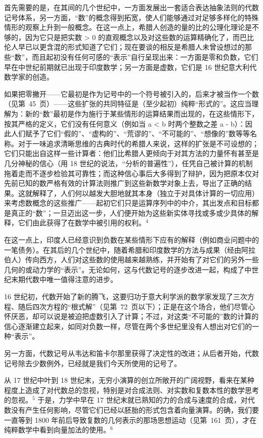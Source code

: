 首先需要的是，在其间的几个世纪中，一方面发展出一套适合表达抽象法则的代数记号体系，另一方面，“数”的概念得到拓宽，使人们能够通过对足够多样化的特殊情形的观察上升到一般概念。在这一点上，希腊人创造的量的比的公理化理论是不够的，因为它只是把实数 \textgreater{} 0 的直观概念以及对这些数的运算精确化了，而巴比伦人早已以更含混的形式知道了它们；现在要谈的相反是希腊人未曾设想过的那些“数”，而且起初没有任何可感的“表示”自行呈现出来：一方面是零和负数，它们早在中世纪前期就已出现于印度数学；另一方面是虚数，它们是 16 世纪意大利代数学家的创造。

如果把零撇开——它最初是作为记号中的一个符号被引入的，后来才被当作一个数（见第~45~页）——这些扩张的共同特征是（至少起初）纯粹“形式的”。这应当理解为：新的“数”最初是作为施行于某些情形的运算结果而出现的，在这些情形下，按其严格的定义，它们没有任何意义（例如当 a \textless{} b 时两个整数之差 a - b）：因此人们赋予了它们“假的”、“虚构的”、“荒谬的”、“不可能的”、“想像的”数等等名称。对于一味追求清晰思维的古典时代的希腊人来说，这样的扩张是不可设想的；它们只能出自这样一些计算者：他们比希腊人更倾向于对其方法的力量怀有甚至是几分神秘的信心（用 18 世纪的说法，“分析的普遍性”），任凭自己被计算的机制拖着走而不逐步检验其可靠性；而这种信心事后大多得到了辩护，因为把原本仅对先前已知的数严格有效的计算法则推广到这些新数学对象上去，导出了正确的结果。这就解释了，人们何以越发大胆地就其本身（独立于对具体计算的一切应用）来考虑数概念的这些推广——起初它们只是运算序列中的中介，其出发点和目标都是真正的“数”；一旦迈出这一步，人们便开始为这些新实体寻找或多或少具体的解释，它们由此获得了在数学中被引用的权利。\(^{4}\)

在这一点上，印度人已经意识到负数在某些情形下应有的解释（例如商业问题中的一笔债务）。在其后的几个世纪中，随着希腊和印度数学的方法与成果（经由阿拉伯人）传向西方，人们对这些数的使用越来越熟练，并开始有了对它们的另外一些几何的或动力学的“表示”。无论如何，这与代数记号的逐步改进一起，构成了中世纪末期代数中唯一值得注意的进步。

16 世纪初，代数开始了新的腾飞，这要归功于意大利学派的数学家发现了三次方程、随后四次方程的“根式解”（见第~72~页以下）；正是在这个场合，他们尽管心怀厌恶，却可以说是被迫把虚数引入了计算；不过，对这类“不可能的”数的计算的信心逐渐建立起来，如同对负数一样，尽管在两个多世纪里没有人想出对它们的一种“表示”。

另一方面，代数记号从韦达和笛卡尔那里获得了决定性的改进；从后者开始，代数记号除去少数例外，已经就是我们今天所使用的记号了。

从 17 世纪中叶到 18 世纪末，无穷小演算的创立所敞开的广阔视野，看来在某种程度上造成了对代数总的忽视，特别是对合成法则、对实数和复数本性的数学思考的忽视。\(^{5}\) 于是，力学中早在 17 世纪末就已熟知的力的合成与速度的合成，对代数没有产生任何影响，尽管它们已经以胚胎的形式包含着向量演算。的确，我们要一直等到 1800 年前后导致复数的几何表示的那场思想运动（见第~161~页），才在纯粹数学中看到向量加法的使用。\(^{6}\)

